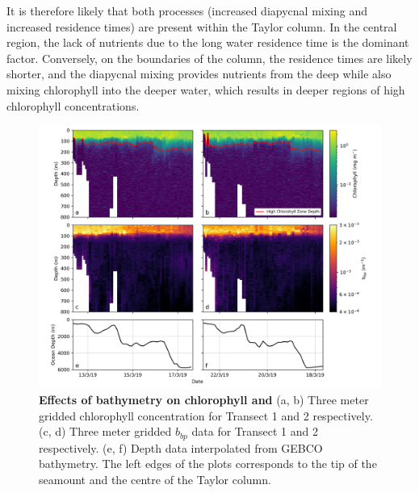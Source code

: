 \documentclass[
	a4paper, %
	10pt, %
	unnumberedsections, %
	twoside, %
]{LTJournalArticle}
\begin{document}
\begin{multicols}{2}
It is therefore likely that both processes (increased diapycnal mixing and increased residence times) are present within the Taylor column.
In the central region, the lack of nutrients due to the long water residence time is the dominant factor. Conversely, on the boundaries of the
column, the residence times are likely shorter, and the diapycnal mixing provides nutrients from the deep while also mixing chlorophyll into the
deeper water, which results in deeper regions of high chlorophyll concentrations. 

\end{multicols}
\begin{figure}[H] 
	\includegraphics[width=\linewidth]{Louis/figures/figureI.png}
	\caption{\textbf{Effects of bathymetry on chlorophyll and}   (a, b) Three meter gridded chlorophyll concentration for Transect 1 and 2 respectively. (c, d) Three meter gridded $b_{bp}$ data for Transect 1 and 2 respectively. (e, f) Depth data interpolated from GEBCO bathymetry. The left edges of the plots corresponds to the tip of the seamount and the centre of the Taylor column.}
	\label{fig:I}
\end{figure}
\end{document}
